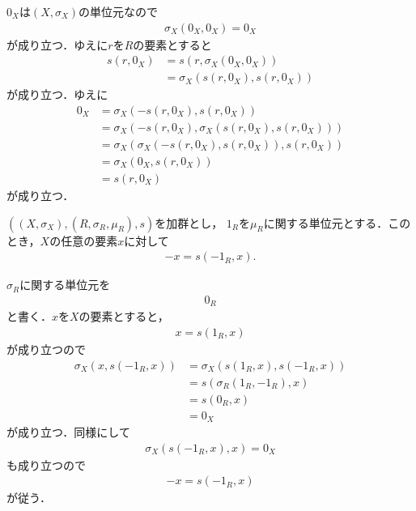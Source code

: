 	\begin{sketch}
		$0_X$は$(X,\sigma_X)$の単位元なので
		\begin{align}
			\sigma_X\left(0_X,0_X\right) = 0_X
		\end{align}
		が成り立つ．ゆえに$r$を$R$の要素とすると
		\begin{align}
			s\left(r,0_X\right) &= s\left(r,\sigma_X\left(0_X,0_X\right)\right) \\
			&= \sigma_X\left(s\left(r,0_X\right),s\left(r,0_X\right)\right)
		\end{align}
		が成り立つ．ゆえに
		\begin{align}
			0_X &= \sigma_X\left(-s\left(r,0_X\right),s\left(r,0_X\right)\right) \\
			&= \sigma_X\left(-s\left(r,0_X\right),\sigma_X\left(s\left(r,0_X\right),s\left(r,0_X\right)\right)\right) \\
			&= \sigma_X\left(\sigma_X\left(-s\left(r,0_X\right),s\left(r,0_X\right)\right),s\left(r,0_X\right)\right) \\
			&= \sigma_X\left(0_X,s\left(r,0_X\right)\right) \\
			&= s\left(r,0_X\right)
		\end{align}
		が成り立つ．
		\QED
	\end{sketch}
	
	\begin{screen}
		\begin{thm}\label{thm:inverse_element_equals_to_its_minus}
			$\left((X,\sigma_X),(R,\sigma_R,\mu_R),s\right)$を加群とし，
			$1_R$を$\mu_R$に関する単位元とする．このとき，$X$の任意の要素$x$に対して
			\begin{align}
				-x = s\left(-1_R,x\right).
			\end{align}
		\end{thm}
	\end{screen}
	
	\begin{sketch}
		$\sigma_R$に関する単位元を
		\begin{align}
			0_R
		\end{align}
		と書く．$x$を$X$の要素とすると，
		\begin{align}
			x = s\left(1_R,x\right)
		\end{align}
		が成り立つので
		\begin{align}
			\sigma_X\left(x,s\left(-1_R,x\right)\right) &= \sigma_X\left(s\left(1_R,x\right),s\left(-1_R,x\right)\right) \\
			&= s\left(\sigma_R\left(1_R,-1_R\right),x\right) \\
			&= s\left(0_R,x\right) \\
			&= 0_X
		\end{align}
		が成り立つ．同様にして
		\begin{align}
			\sigma_X\left(s\left(-1_R,x\right),x\right) = 0_X
		\end{align}
		も成り立つので
		\begin{align}
			-x = s\left(-1_R,x\right)
		\end{align}
		が従う．
		\QED
	\end{sketch}
	
	\begin{screen}
		\begin{dfn}[加群準同型]
			
		\end{dfn}
	\end{screen}